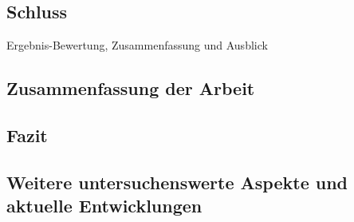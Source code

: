 \begin{spacing}{1.2}

\chapter{Schluss}
\label{sec:schluss}
Ergebnis-Bewertung, Zusammenfassung und Ausblick

\section{Zusammenfassung der Arbeit}

\section{Fazit}

\section{Weitere untersuchenswerte Aspekte und aktuelle Entwicklungen}

\end{spacing}
